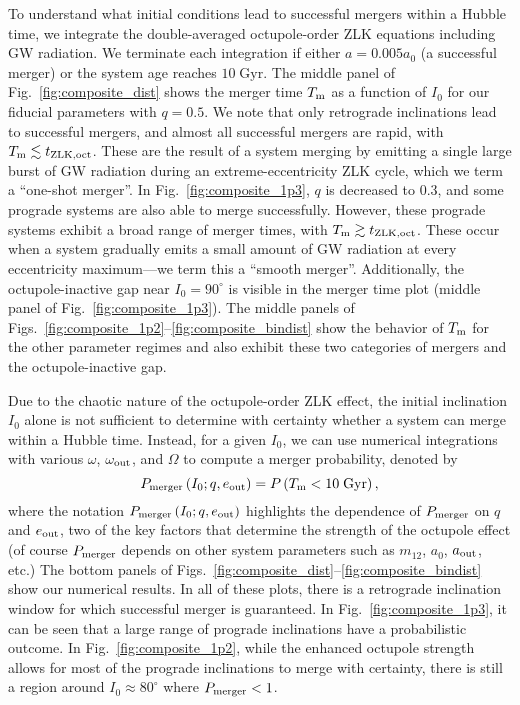 \documentclass[
        fleqn,
        usenatbib,
    ]{mnras}
\newcommand*{\p}[1]{\left(#1\right)}
\begin{document}
To understand what initial conditions lead to successful mergers within a Hubble
time, we integrate the double-averaged octupole-order ZLK equations including GW
radiation. We terminate each integration if either $a = 0.005a_0$ (a successful
merger) or the system age reaches $10\;\mathrm{Gyr}$. The middle panel of
Fig.~\ref{fig:composite_dist} shows the merger time $T_{\rm m}$ as a function of
$I_0$ for our fiducial parameters with $q = 0.5$. We note that only retrograde
inclinations lead to successful mergers, and almost all successful mergers are
rapid, with $T_{\rm m} \lesssim t_{\rm ZLK, oct}$. These are the result of a
system merging by emitting a single large burst of GW radiation during an
extreme-eccentricity ZLK cycle, which we term a ``one-shot merger''. In
Fig.~\ref{fig:composite_1p3}, $q$ is decreased to $0.3$, and some prograde
systems are also able to merge successfully. However, these prograde systems
exhibit a broad range of merger times, with $T_{\rm m} \gtrsim t_{\rm ZLK,
oct}$. These occur when a system gradually emits a small amount of GW radiation
at every eccentricity maximum---we term this a ``smooth merger''. Additionally,
the octupole-inactive gap near $I_0 = 90^\circ$ is visible in the merger time
plot (middle panel of Fig.~\ref{fig:composite_1p3}). The middle panels of
Figs.~\ref{fig:composite_1p2}--\ref{fig:composite_bindist} show the behavior of
$T_{\rm m}$ for the other parameter regimes and also exhibit these two
categories of mergers and the octupole-inactive gap.

Due to the chaotic nature of the octupole-order ZLK effect, the initial
inclination $I_0$ alone is not sufficient to determine with certainty whether a
system can merge within a Hubble time. Instead, for a given $I_0$, we can use
numerical integrations with various $\omega$, $\omega_{\rm out}$, and $\Omega$
to compute a merger probability, denoted by
\begin{equation}
    P_{\rm merger}\p{I_0; q, e_{\rm out}} = P\p{T_{\rm m} < 10\;\mathrm{Gyr}},
        \label{eq:def_pmerge}
\end{equation}
where the notation $P_{\rm merger}\p{I_0; q, e_{\rm out}}$ highlights the
dependence of $P_{\rm merger}$
on $q$ and $e_{\rm out}$, two of the key factors that determine the strength of the
octupole effect (of course $P_{\rm merger}$ depends on other system parameters
such as $m_12$, $a_0$, $a_{\rm out}$, etc.)
The bottom panels of Figs.~\ref{fig:composite_dist}--\ref{fig:composite_bindist}
show our numerical results. In all of these plots, there is a retrograde
inclination window for which successful merger is guaranteed. In
Fig.~\ref{fig:composite_1p3}, it can be seen that a large range of prograde
inclinations have a probabilistic outcome. In Fig.~\ref{fig:composite_1p2},
while the enhanced octupole strength allows for most of the prograde
inclinations to merge with certainty, there is still a region around $I_0 \approx
80^\circ$ where $P_{\rm merger} < 1$.
\end{document}
